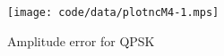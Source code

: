 \documentclass[conference]{IEEEtran}
\begin{document}
\begin{figure}[p]
	\centering
		\texttt{[image: code/data/plotncM4-1.mps]}
		\caption{Amplitude error for QPSK}
		\label{fig:plotampM}
\end{figure}



\small

\end{document}
